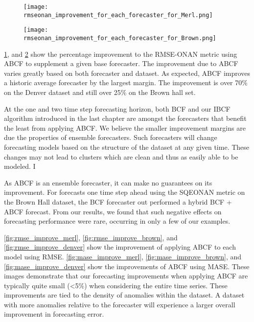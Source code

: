 \begin{figure}[!h]
	\begin{center}
		\texttt{[image: rmseonan\_improvement\_for\_each\_forecaster\_for\_Merl.png]}
	\end{center}
	\caption{}
	\label{fig:rmseonan_improve_merl}
\end{figure}

\begin{figure}[!h]
	\begin{center}
		\texttt{[image: rmseonan\_improvement\_for\_each\_forecaster\_for\_Brown.png]}
	\end{center}
	\caption{}
	\label{fig:rmseonan_improve_brown}
\end{figure}


\ref{fig:rmseonan_improve_merl}, and \ref{fig:rmseonan_improve_brown} show the percentage improvement to the RMSE-ONAN metric using ABCF to supplement a given base forecaster.  The improvement due to ABCF varies greatly based on both forecaster and dataset.  As expected, ABCF improves a historic average forecaster by the largest margin.  The improvement is over 70\% on the Denver dataset and still over 25\% on the Brown hall set.

At the one and two time step forecasting horizon, both BCF and our IBCF algorithm introduced in the last chapter are amongst the forecasters that benefit the least from applying ABCF.  We believe the smaller improvement margins are due the properties of ensemble forecasters.  Such forecasters will change forecasting models based on the structure of the dataset at any given time.  These changes may not lead to clusters which are clean and thus as easily able to be modeled.  I

As ABCF is an ensemble forecaster, it can make no guarantees on its improvement.  For forecasts one time step ahead using the SQEONAN metric on the Brown Hall dataset, the BCF forecaster out performed a hybrid BCF + ABCF forecast.  From our results, we found that such negative effects on forecasting performance were rare, occurring in only a few of our examples.

\ref{fig:rmse_improve_merl}, \ref{fig:rmse_improve_brown}, and \ref{fig:rmse_improve_denver} show the improvement of applying ABCF to each model using RMSE. \ref{fig:mase_improve_merl}, \ref{fig:mase_improve_brown}, and \ref{fig:mase_improve_denver} show the improvements of ABCF using MASE.  These images demonstrate that our forecasting improvements when applying ABCF are typically quite small (<5\%) when considering the entire time series.  These improvements are tied to the density of anomalies within the dataset.  A dataset with more anomalies relative to the forecaster will experience a larger overall improvement in forecasting error.

